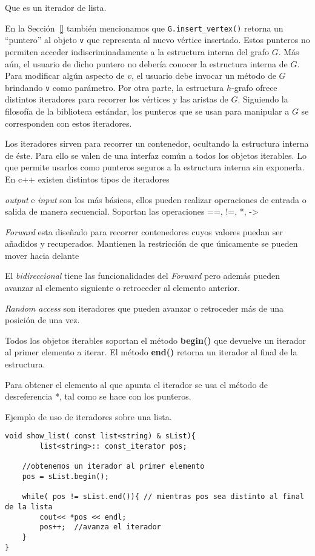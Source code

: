 \documentclass[a4paper,12pt]{article}
\begin{document}
Que es un iterador de lista.

En la Sección~\ref{} también mencionamos que \texttt{G.insert\_vertex()} retorna un ``puntero'' al objeto \texttt{v} que representa al nuevo vértice insertado.  Estos punteros no permiten acceder indiscriminadamente a la estructura interna del grafo $G$.  Más aún, el usuario de dicho puntero no debería conocer la estructura interna de $G$.  Para modificar algún aspecto de $v$, el usuario debe invocar un método de $G$ brindando \texttt{v} como parámetro.  Por otra parte, la estructura $h$-grafo ofrece distintos iteradores para recorrer los vértices y las aristas de $G$.  Siguiendo la filosofía de la biblioteca estándar, los punteros que se usan para manipular a $G$ se corresponden con estos iteradores.





Los iteradores sirven para recorrer un contenedor, ocultando la estructura interna de éste. Para ello se valen de una interfaz común a todos los objetos iterables. Lo que permite usarlos como punteros seguros a la estructura interna sin exponerla.
En c++ existen distintos tipos de iteradores 

 \emph{output} e  \emph{input }son los más básicos, ellos pueden realizar operaciones de entrada o salida de manera secuencial. Soportan las operaciones ==, !=, *, ->

 \emph{Forward} esta diseñado para recorrer contenedores cuyos valores puedan ser añadidos y recuperados. Mantienen la restricción de que únicamente se pueden mover hacia delante

El  \emph{bidireccional}  tiene las funcionalidades del \emph{Forward} pero además  pueden avanzar al elemento siguiente o retroceder al elemento anterior.

\emph{Random access} son iteradores que pueden avanzar o retroceder más de una posición de una vez.

Todos los objetos iterables soportan el método \textbf{begin()} que devuelve un iterador al primer elemento a iterar.
El método \textbf{end()} retorna un iterador al final de la estructura. 

Para obtener el elemento al que apunta el iterador se usa el método de desreferencia *, tal como se hace con los punteros.



Ejemplo de uso de iteradores sobre una lista.



\lstset{language=C, breaklines=true, basicstyle=\footnotesize}
\begin{lstlisting}[frame=single]
void show_list( const list<string) & sList){
        list<string>:: const_iterator pos;
    
    //obtenemos un iterador al primer elemento
    pos = sList.begin();
    
    while( pos != sList.end()){ // mientras pos sea distinto al final de la lista
        cout<< *pos << endl;
        pos++;  //avanza el iterador
    }
}
\end{lstlisting}
\end{document}
